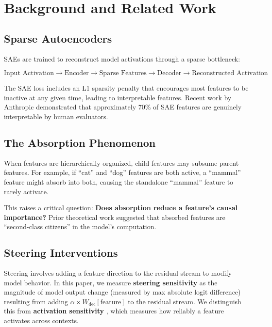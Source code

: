 \documentclass{article}
\begin{document}
\section{Background and Related Work}

\subsection{Sparse Autoencoders}

SAEs are trained to reconstruct model activations through a sparse bottleneck:

\begin{equation}
\text{Input Activation} \rightarrow \text{Encoder} \rightarrow \text{Sparse Features} \rightarrow \text{Decoder} \rightarrow \text{Reconstructed Activation}
\end{equation}

The SAE loss includes an L1 sparsity penalty that encourages most features to be inactive at any given time, leading to interpretable features. Recent work by Anthropic \citep{anthropic2023towards} demonstrated that approximately 70\% of SAE features are genuinely interpretable by human evaluators.

\subsection{The Absorption Phenomenon}

When features are hierarchically organized, child features may subsume parent features. For example, if ``cat'' and ``dog'' features are both active, a ``mammal'' feature might absorb into both, causing the standalone ``mammal'' feature to rarely activate.

This raises a critical question: \textbf{Does absorption reduce a feature's causal importance?} Prior theoretical work suggested that absorbed features are ``second-class citizens'' in the model's computation.

\subsection{Steering Interventions}

Steering involves adding a feature direction to the residual stream to modify model behavior. In this paper, we measure \textbf{steering sensitivity} as the magnitude of model output change (measured by max absolute logit difference) resulting from adding $\alpha \times W_{\text{dec}}[\text{feature}]$ to the residual stream. We distinguish this from \textbf{activation sensitivity} \citep{tian2025understanding}, which measures how reliably a feature activates across contexts.
\end{document}
